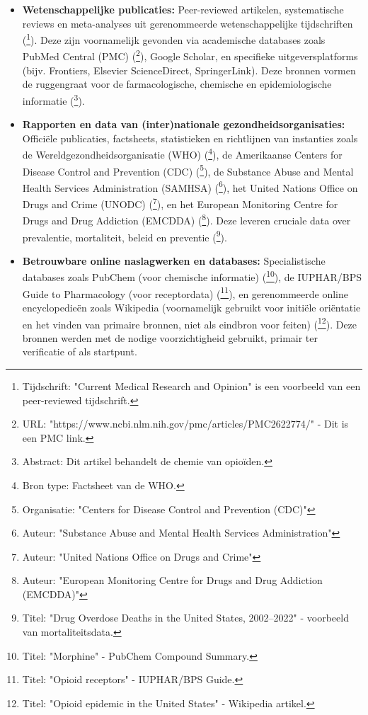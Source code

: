 \documentclass[11pt, a4paper]{report} %
\begin{document}
\begin{itemize}
    \item \textbf{Wetenschappelijke publicaties:} Peer-reviewed artikelen, systematische reviews en meta-analyses uit gerenommeerde wetenschappelijke tijdschriften (\cite{Riley2008OxycodoneReview}\footnote{Tijdschrift: "Current Medical Research and Opinion" is een voorbeeld van een peer-reviewed tijdschrift.}). Deze zijn voornamelijk gevonden via academische databases zoals PubMed Central (PMC) (\cite{Trescot2008OpioidPharm}\footnote{URL: "https://www.ncbi.nlm.nih.gov/pmc/articles/PMC2622774/" - Dit is een PMC link.}), Google Scholar, en specifieke uitgeversplatforms (bijv. Frontiers, Elsevier ScienceDirect, SpringerLink). Deze bronnen vormen de ruggengraat voor de farmacologische, chemische en epidemiologische informatie (\cite{Gupta2010ChemistryOpioids}\footnote{Abstract: Dit artikel behandelt de chemie van opioïden.}).
    \item \textbf{Rapporten en data van (inter)nationale gezondheidsorganisaties:} Officiële publicaties, factsheets, statistieken en richtlijnen van instanties zoals de Wereldgezondheidsorganisatie (WHO) (\cite{WHO2023Opioid}\footnote{Bron type: Factsheet van de WHO.}), de Amerikaanse Centers for Disease Control and Prevention (CDC) (\cite{CDCUnderstandingEpidemic}\footnote{Organisatie: "Centers for Disease Control and Prevention (CDC)"}), de Substance Abuse and Mental Health Services Administration (SAMHSA) (\cite{SAMHSA2022NSDUH}\footnote{Auteur: "Substance Abuse and Mental Health Services Administration"}), het United Nations Office on Drugs and Crime (UNODC) (\cite{UNODC2010WDR}\footnote{Auteur: "United Nations Office on Drugs and Crime"}), en het European Monitoring Centre for Drugs and Drug Addiction (EMCDDA) (\cite{EMCDDAFentanylProfile}\footnote{Auteur: "European Monitoring Centre for Drugs and Drug Addiction (EMCDDA)"}). Deze leveren cruciale data over prevalentie, mortaliteit, beleid en preventie (\cite{CDC2024DataBrief491}\footnote{Titel: "Drug Overdose Deaths in the United States, 2002–2022" - voorbeeld van mortaliteitsdata.}).
    \item \textbf{Betrouwbare online naslagwerken en databases:} Specialistische databases zoals PubChem (voor chemische informatie) (\cite{PubChem-morphine}\footnote{Titel: "Morphine" - PubChem Compound Summary.}), de IUPHAR/BPS Guide to Pharmacology (voor receptordata) (\cite{IUPHAROpioidReceptors}\footnote{Titel: "Opioid receptors" - IUPHAR/BPS Guide.}), en gerenommeerde online encyclopedieën zoals Wikipedia (voornamelijk gebruikt voor initiële oriëntatie en het vinden van primaire bronnen, niet als eindbron voor feiten) (\cite{WikipediaOpioidEpidemicUS}\footnote{Titel: "Opioid epidemic in the United States" - Wikipedia artikel.}). Deze bronnen werden met de nodige voorzichtigheid gebruikt, primair ter verificatie of als startpunt.

\end{itemize}
\end{document}
